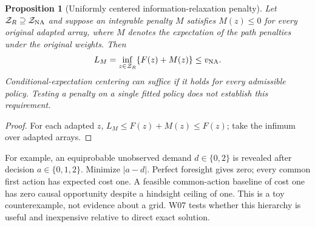 \documentclass[11pt,letterpaper]{article}
\newtheorem{coaprop}[coathm]{Proposition}
\begin{document}
\begin{coaprop}[Uniformly centered information-relaxation penalty]
\label{prop:coapenalty}
Let $\mathcal Z_R\supseteq\mathcal Z_{\rm NA}$ and suppose an integrable penalty $M$ satisfies $M(z)\le0$ for every original adapted array, where $M$ denotes the expectation of the path penalties under the original weights. Then
\[
 L_M=\inf_{z\in\mathcal Z_R}\{F(z)+M(z)\}\le v_{\rm NA}.
\]
Conditional-expectation centering can suffice if it holds for every admissible policy. Testing a penalty on a single fitted policy does not establish this requirement.
\end{coaprop}
\begin{proof}For each adapted $z$, $L_M\le F(z)+M(z)\le F(z)$; take the infimum over adapted arrays.\end{proof}
For example, an equiprobable unobserved demand $d\in\{0,2\}$ is revealed after decision $a\in\{0,1,2\}$. Minimize $|a-d|$. Perfect foresight gives zero; every common first action has expected cost one. A feasible common-action baseline of cost one has zero causal opportunity despite a hindsight ceiling of one. This is a toy counterexample, not evidence about a grid. W07 tests whether this hierarchy is useful and inexpensive relative to direct exact solution.
\end{document}
